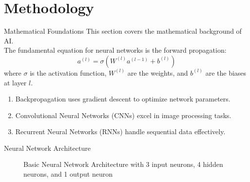 \documentclass{ctexbeamer}
\begin{document}
\section{Methodology}
\begin{frame}{Mathematical Foundations}
    This section covers the mathematical background of AI.\\
    The fundamental equation for neural networks is the forward propagation:
        \[
        a^{(l)} = \sigma(W^{(l)}a^{(l-1)} + b^{(l)})
        \]
    where $\sigma$ is the activation function, $W^{(l)}$ are the weights, and $b^{(l)}$ are the biases at layer $l$.
    \begin{enumerate}
        \item Backpropagation uses gradient descent to optimize network parameters.
        \item Convolutional Neural Networks (CNNs) excel in image processing tasks.
        \item Recurrent Neural Networks (RNNs) handle sequential data effectively.
    \end{enumerate}
\end{frame}
\begin{frame}{Neural Network Architecture}
    \begin{figure}
        \centering
        \caption{Basic Neural Network Architecture with 3 input neurons, 4 hidden neurons, and 1 output neuron}
        \label{fig:nn_arch}
    \end{figure}
\end{frame}
\end{document}
